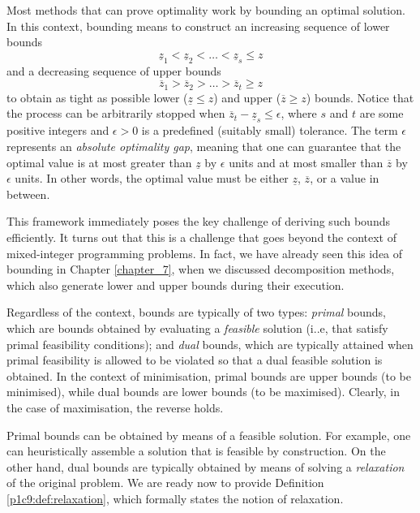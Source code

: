 Most methods that can prove optimality work by bounding an optimal solution. In this context, bounding means to construct an increasing sequence of lower bounds
%
\begin{equation*}
	\underline{z}_1 < \underline{z}_2 < \dots < \underline{z}_s \leq z	
\end{equation*}
%
and a decreasing sequence of upper bounds
%
\begin{equation*}
	\overline{z}_1 > \overline{z}_2 > \dots > \overline{z}_t \geq z
\end{equation*}
%
to obtain as tight as possible lower ($\underline{z} \leq z$) and upper ($\overline{z} \geq z$) bounds. Notice that the process can be arbitrarily stopped when $\overline{z}_t - \underline{z}_s \leq \epsilon$, where $s$ and $t$ are some positive integers and $\epsilon > 0$ is a predefined (suitably small) tolerance. The term $\epsilon$ represents an \emph{absolute optimality gap}, meaning that one can guarantee that the optimal value is at most greater than $\underline{z}$ by $\epsilon$ units and at most smaller than $\overline{z}$ by $\epsilon$ units. In other words, the optimal value must be either $\underline{z}$, $\overline{z}$, or a value in between.

This framework immediately poses the key challenge of deriving such bounds efficiently. It turns out that this is a challenge that goes beyond the context of mixed-integer programming problems. In fact, we have already seen this idea of bounding in Chapter \ref{chapter_7}, when we discussed decomposition methods, which also generate lower and upper bounds during their execution.

Regardless of the context, bounds are typically of two types: \emph{primal} bounds, which are bounds obtained by evaluating a \emph{feasible} solution (i..e, that satisfy primal feasibility conditions); and \emph{dual} bounds, which are typically attained when primal feasibility is allowed to be violated so that a dual feasible solution is obtained. In the context of minimisation, primal bounds are upper bounds (to be minimised), while dual bounds are lower bounds (to be maximised). Clearly, in the case of maximisation, the reverse holds. 

Primal bounds can be obtained by means of a feasible solution. For example, one can heuristically assemble a solution that is feasible by construction. On the other hand, dual bounds are typically obtained by means of solving a \emph{relaxation} of the original problem. We are ready now to provide Definition \ref{p1c9:def:relaxation}, which formally states the notion of relaxation.

